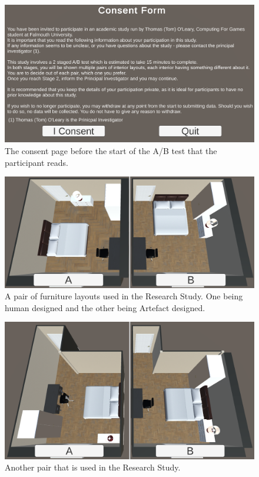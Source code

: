 \begin{figure}[!ht]
    \includegraphics[width=\columnwidth]{./Images/consent-form.png}
    \centering
    \caption{The consent page before the start of the A/B test that the participant reads.}
    \label{consent-screen}
\end{figure}
\begin{figure}[!ht]
    \includegraphics[width=\columnwidth]{./Images/pair-3.png}
    \centering
    \caption{A pair of furniture layouts used in the Research Study. One being human designed and the other being Artefact designed.}
    \label{pair-example-1}
\end{figure}
\begin{figure}[!ht]
    \includegraphics[width=\columnwidth]{./Images/pair-1.png}
    \centering
    \caption{Another pair that is used in the Research Study.}
    \label{pair-example-2}
\end{figure}

